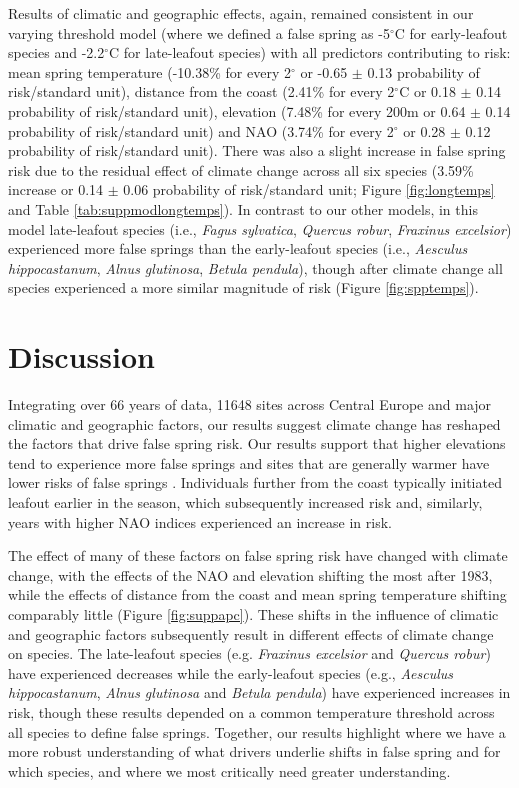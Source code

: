 \documentclass{article}\usepackage[]{graphicx}\usepackage[]{color}
\newcommand{\R}[1]{\label{#1}\linelabel{#1}}
\begin{document}
Results of climatic and geographic effects, again, remained consistent in our varying threshold model (where we defined a false spring as -5$^{\circ}$C for early-leafout species and -2.2$^{\circ}$C for late-leafout species) with all predictors contributing to risk: mean spring temperature (-10.38\% for every 2$^\circ$ or -0.65 $\pm$ 0.13 probability of risk/standard unit), distance from the coast (2.41\% for every 2$^\circ$C or 0.18 $\pm$ 0.14 probability of risk/standard unit), elevation (7.48\% for every 200m or 0.64 $\pm$ 0.14 probability of risk/standard unit) and NAO (3.74\% for every 2$^\circ$ or 0.28 $\pm$ 0.12 probability of risk/standard unit). There was also a slight increase in false spring risk due to the residual effect of climate change across all six species (3.59\% increase or 0.14 $\pm$ 0.06 probability of risk/standard unit; Figure \ref{fig:longtemps} and Table \ref{tab:suppmodlongtemps}). In contrast to our other models, in this model late-leafout species (i.e., \textit{Fagus sylvatica}, \textit{Quercus robur}, \textit{Fraxinus excelsior}) experienced more false springs than the early-leafout species (i.e., \textit{Aesculus hippocastanum}, \textit{Alnus glutinosa}, \textit{Betula pendula}), though after climate change all species experienced a more similar magnitude of risk (Figure \ref{fig:spptemps}). 

\section*{Discussion} %
Integrating over 66 years of data, 11648 sites across Central Europe and major climatic and geographic factors, our results suggest climate change has reshaped the factors that drive false spring risk. Our results support that higher elevations tend to experience more false springs \citep{Vitra2017,Vitasse2018} and sites that are generally warmer have lower risks of false springs \citep{Wypych2016}. Individuals further from the coast typically initiated leafout earlier in the season, which subsequently increased risk and, similarly, years with higher NAO indices experienced an increase in risk. 

The effect of many of these factors on false spring risk have changed with climate change, with the effects of the NAO and elevation shifting the most after 1983, while the effects of distance from the coast and mean spring temperature shifting comparably little (Figure \ref{fig:suppapc}). These shifts in the influence of climatic and geographic factors subsequently result in different effects of climate change on species. \R{Z2thresh}The late-leafout species (e.g. \textit{Fraxinus excelsior} and \textit{Quercus robur}) have experienced decreases while the early-leafout species (e.g., \textit{Aesculus hippocastanum}, \textit{Alnus glutinosa} and \textit{Betula pendula}) have experienced increases in risk, though these results depended on a common temperature threshold across all species to define false springs. Together, our results highlight where we have a more robust understanding of what drivers underlie shifts in false spring and for which species, and where we most critically need greater understanding\R{Z2threshend}.
\end{document}
